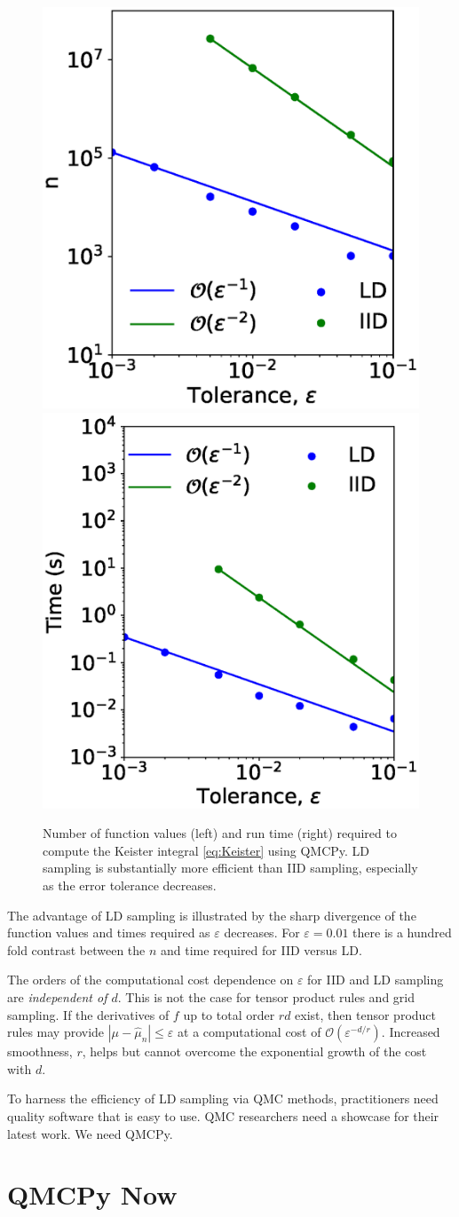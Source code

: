 \documentclass[11pt]{NSFamsart}
\def\abs#1{\ensuremath{\left \lvert #1 \right \rvert}}
\newcommand{\Order}{\mathcal{O}}
\newcommand{\hmu}{\hat{\mu}}
\begin{document}
\begin{figure}
	\centering
	\includegraphics[height =0.32\textwidth]{ProgramsImages/keister_n.eps}
	\includegraphics[height =0.32\textwidth]{ProgramsImages/keister_timing.eps}
	\caption{Number of function values (left) and run time (right) required to compute the Keister integral \eqref{eq:Keister} using QMCPy.  LD sampling is substantially more efficient than IID sampling, especially as the error tolerance decreases.}
	\label{fig:KeisterTimes}
\end{figure}

The advantage of LD sampling is illustrated by the sharp divergence of the function values and times required as $\varepsilon$ decreases.  For $\varepsilon = 0.01$ there is a hundred fold contrast between the $n$ and time required for IID versus LD.

The orders of the computational cost dependence on $\varepsilon$ for IID and LD sampling are \emph{independent of $d$}.  This is not the case for tensor product rules and grid sampling.  If the derivatives of $f$ up to total order $rd$ exist, then tensor product rules may provide $\abs{\mu - \hmu_n} \le \varepsilon$  at a computational cost of $\Order(\varepsilon^{-d/r})$.   Increased smoothness, $r$, helps but cannot overcome the exponential growth of the cost with $d$.

To harness the efficiency of LD sampling via QMC methods, practitioners need quality software that is easy to use.  QMC researchers need a showcase  for their latest work.  We need QMCPy.

\section{QMCPy Now}
\end{document}
